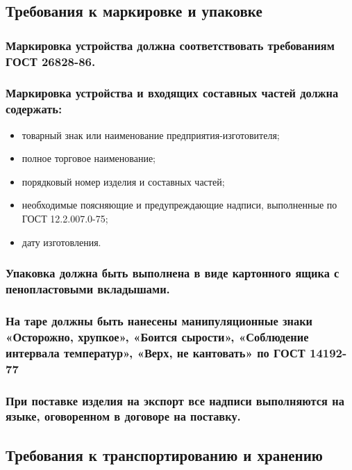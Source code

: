 \documentclass[a4paper]{bsuir-tor}
\begin{document}
\subsection{Требования к маркировке и упаковке}

\subsubsection{Маркировка устройства должна соответствовать
  требованиям ГОСТ 26828-86.}

\subsubsection{Маркировка устройства и входящих составных частей должна содержать:}
\begin{itemize}
\item товарный знак или наименование предприятия-изготовителя;
\item полное торговое наименование;  
\item порядковый номер изделия и составных частей;
\item необходимые поясняющие и предупреждающие надписи,
  выполненные по ГОСТ 12.2.007.0-75;
\item дату изготовления.
\end{itemize}

\subsubsection{Упаковка должна быть выполнена в виде картонного ящика
  с пенопластовыми вкладышами.}

\subsubsection{На таре должны быть нанесены манипуляционные знаки
  «Осторожно, хрупкое»,
  «Боится сырости»,
  «Соблюдение интервала температур», «Верх, не кантовать» по ГОСТ 14192-77}


\subsubsection{При поставке изделия на экспорт все надписи
  выполняются на языке, оговоренном в договоре на поставку.}

\subsection{Требования к транспортированию и хранению}
\end{document}
